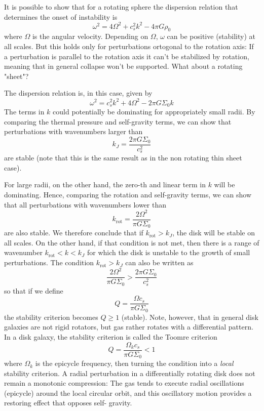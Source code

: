 It is possible to show that for a rotating sphere the dispersion relation that determines the onset of instability is
\begin{equation*}
    \omega^{2} = 4\Omega^{2}+c_{s}^{2}k^{2}-4\pi G\rho_{0}
\end{equation*}
where $\Omega$ is the angular velocity. Depending on $\Omega$, $\omega$ can be positive (stability) at all scales. But this holds only for perturbations ortogonal to the rotation axis: If a perturbation
is parallel to the rotation axis it can’t be stabilized by rotation, meaning that in general collapse won't be supported. What about a rotating "sheet"?
\par The dispersion relation is, in this case, given by
\begin{equation*}
    \omega^{2} = c_{s}^{2}k^{2}+4\Omega^{2}-2\pi G\Sigma_{0}k
\end{equation*}
The terms in $k$ could potentially be dominating for appropriately small radii. By comparing the thermal pressure and self-gravity terms, we can show that perturbations with wavenumbers larger than
\begin{equation*}
    k_{J} = \frac{2\pi G\Sigma_{0}}{c_{s}^{2}}
\end{equation*}
are stable (note that this is the same result as in the non rotating thin sheet case).
\par For large radii, on the other hand, the zero-th and linear term in $k$ will be dominating. Hence, comparing the rotation and self-gravity terms, we can show that all perturbations with wavenumbers lower than
\begin{equation*}
    k_{\text{rot}} = \frac{2\Omega^{2}}{\pi G \Sigma_{0}}
\end{equation*}
are also stable. We therefore conclude that if $k_{\text{rot}} > k_{J}$, the disk will be stable on all scales. On the other hand, if that condition is not met, then there is a range of wavenumber $k_{\text{rot}} < k < k_{J}$ for which the disk is unstable to the growth of small perturbations. The condition $k_{\text{rot}} > k_{J}$ can also be written as 
\begin{equation*}
    \frac{2\Omega^{2}}{\pi G \Sigma_{0}} > \frac{2\pi G\Sigma_{0}}{c_{s}^{2}} 
\end{equation*}
so that if we define 
\begin{equation*}
    Q = \frac{\Omega c_{s}}{\pi G \Sigma_{0}}
\end{equation*}
the stability criterion becomes $Q \geq 1$ (stable). Note, however, that in general disk galaxies are not rigid rotators, but gas rather rotates with a differential pattern. In a disk galaxy, the stability criterion is called the Toomre criterion
\begin{equation}
    Q = \frac{\Omega_{k} c_{s}}{\pi G \Sigma_{0}} < 1
\end{equation}
where $\Omega_{k}$ is the epicycle frequency, then turning the condition into a \emph{local} stability criterion. A radial perturbation in a differentially rotating disk does not remain a monotonic compression: The gas tends to execute radial oscillations (epicycle) around the local circular orbit, and this oscillatory motion provides a restoring effect that opposes self- gravity.

